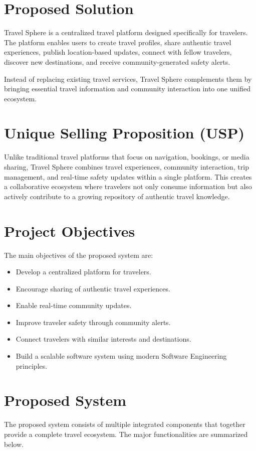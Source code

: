 \documentclass[12pt,a4paper]{article}
\begin{document}
\section{Proposed Solution}
Travel Sphere is a centralized travel platform designed specifically for travelers. The platform enables users to create travel profiles, share authentic travel experiences, publish location-based updates, connect with fellow travelers, discover new destinations, and receive community-generated safety alerts.

Instead of replacing existing travel services, Travel Sphere complements them by bringing essential travel information and community interaction into one unified ecosystem.

\section{Unique Selling Proposition (USP)}
Unlike traditional travel platforms that focus on navigation, bookings, or media sharing, Travel Sphere combines travel experiences, community interaction, trip management, and real-time safety updates within a single platform. This creates a collaborative ecosystem where travelers not only consume information but also actively contribute to a growing repository of authentic travel knowledge.

\section{Project Objectives}
The main objectives of the proposed system are:
\begin{itemize}
    \item Develop a centralized platform for travelers.
    \item Encourage sharing of authentic travel experiences.
    \item Enable real-time community updates.
    \item Improve traveler safety through community alerts.
    \item Connect travelers with similar interests and destinations.
    \item Build a scalable software system using modern Software Engineering principles.
\end{itemize}

\section{Proposed System}
The proposed system consists of multiple integrated components that together provide a complete travel ecosystem. The major functionalities are summarized below.
\end{document}
